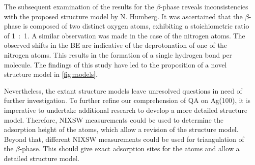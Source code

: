 The subsequent examination of the results for the $\beta$-phase reveals inconsistencies with the proposed structure model by N. Humberg\autocite{Humberg2024,Humberg2020}. It was ascertained that the $\beta$-phase is composed of two distinct oxygen atoms, exhibiting a stoichiometric ratio of 1~:~1. A similar observation was made in the case of the nitrogen atoms. The observed shifts in the \ac{BE} are indicative of the deprotonation of one of the nitrogen atoms. This results in the formation of a single hydrogen bond per molecule. The findings of this study have led to the proposition of a novel structure model in \autoref{fig:models}.

Nevertheless, the extant structure models leave unresolved questions in need of further investigation. To further refine our comprehension of \ac{QA} on Ag(100), it is imperative to undertake additional research to develop a more detailed structure model. Therefore, \ac{NIXSW} measurements could be used to determine the adsorption height of the atoms, which allow a revision of the structure model. Beyond that, different \ac{NIXSW} measurements could be used for triangulation of the $\beta$-phase. This should give exact adsorption sites for the atoms and allow a detailed structure model.

\cleardoublepage